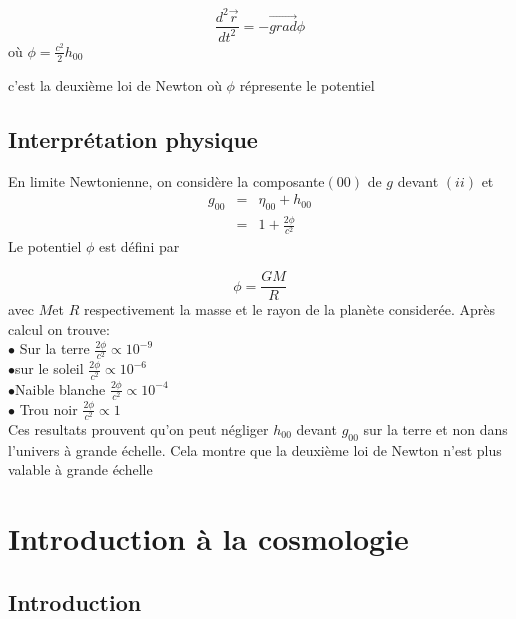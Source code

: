 \documentclass[a4paper,12pt]{report}
\theoremstyle{plain}
\theoremstyle{plain}
\begin{document}
\begin{equation}
 \frac{d^2 \vec r}{dt^2}=- \vec{grad}\phi  
 \end{equation}
o\`u $\phi=\frac{c^2}{2}h_{00}$

c'est la deuxi\`eme loi de Newton o\`u $\phi$ r\'epresente le potentiel \\
\section{Interpr\'etation physique}
En limite Newtonienne,  on consid\`ere la composante$(00)$ de $g$ devant $(ii)$ et 
\begin{eqnarray}
 g_{00}&=& \eta_{00}+ h_{00}\\
 &=&1+\frac{2\phi}{c^2}
\end{eqnarray}
Le potentiel $\phi$ est d\'efini  par 

\begin{equation}
 \phi=\frac{GM}{R}
\end{equation}
avec $M$et $R$ respectivement la masse et le rayon de la plan\`ete consider\'ee.  Apr\`es calcul on trouve:\\
$\bullet$ Sur la terre $\frac{2\phi}{c^2}\propto 10^{-9}$\\
$\bullet$sur le soleil $\frac{2\phi}{c^2} \propto 10^{-6}$\\
$\bullet$Naible  blanche $\frac{2\phi}{c^2}\propto 10^{-4}$\\
$\bullet$ Trou noir $\frac{2\phi}{c^2} \propto  1$\\
Ces resultats prouvent qu'on peut  n\'egliger  $ h_{00}$ devant $ g_{00}$ sur la terre  et non dans l'univers \`a grande \'echelle.  Cela 
montre que la deuxi\`eme loi de Newton n'est plus valable \`a grande \'echelle
 
 
 
 \chapter{Introduction \`a la cosmologie} \label{chapitre3}
 \minitoc
 \section{Introduction}
\end{document}
